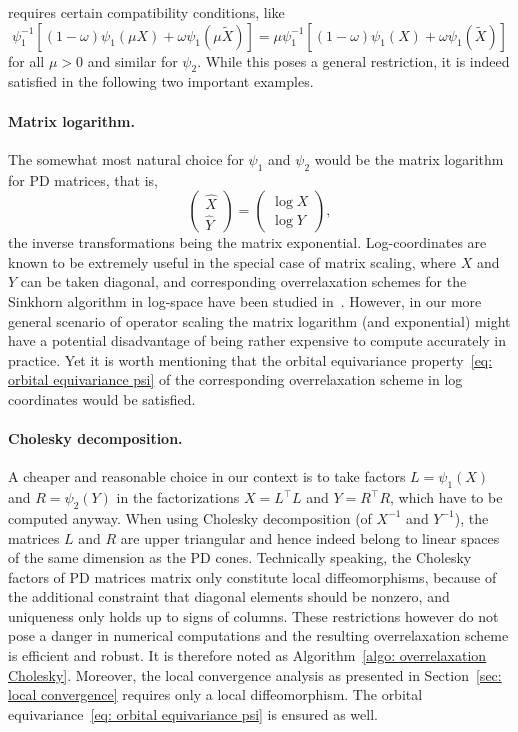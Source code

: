 \documentclass[a4paper]{article}
\theoremstyle{definition}
\numberwithin{equation}{section}
\begin{document}
requires certain compatibility conditions, like
\[
 \psi_1^{-1}[ (1-\omega) \psi_1(\mu X) + \omega \psi_1(\mu \tilde X) ] = \mu \psi_1^{-1}[ (1-\omega) \psi_1(X) + \omega \psi_1(\tilde X) ]
\]
for all $\mu > 0$ and similar for $\psi_2$. While this poses a general restriction, it is indeed satisfied in the following two important examples.

\paragraph{Matrix logarithm.}
The somewhat most natural choice for $\psi_1$ and $\psi_2$ would be the matrix logarithm for PD matrices, that is,
\[
 \begin{pmatrix} \hat X \\ \hat Y \end{pmatrix} = \begin{pmatrix} \log X \\ \log Y \end{pmatrix},
\]
the inverse transformations being the matrix exponential. Log-coordinates are known to be extremely useful in the special case of matrix scaling, where $X$ and $Y$ can be taken diagonal, and corresponding overrelaxation schemes for the Sinkhorn algorithm in log-space have been studied in~\cite{Thibault2021,Lehmann2022}. However, in our more general scenario of operator scaling the matrix logarithm (and exponential) might have a potential disadvantage of being rather expensive to compute accurately in practice. Yet it is worth mentioning that the orbital equivariance property~\eqref{eq: orbital equivariance psi} of the corresponding overrelaxation scheme in log coordinates would be satisfied.

\paragraph{Cholesky decomposition.}
A cheaper and reasonable choice in our context is to take factors $L = \psi_1(X)$ and $R = \psi_2(Y)$ in the factorizations $X = L^\top L$ and $Y = R^\top R$, which have to be computed anyway. When using Cholesky decomposition (of $X^{-1}$ and $Y^{-1}$), the matrices $L$ and $R$ are upper triangular and hence indeed belong to linear spaces of the same dimension as the PD cones. Technically speaking, the Cholesky factors of PD matrices matrix only constitute local diffeomorphisms, because of the additional constraint that diagonal elements should be nonzero, and uniqueness only holds up to signs of columns. These restrictions however do not pose a danger in numerical computations and the resulting overrelaxation scheme is efficient and robust. It is therefore noted as Algorithm~\ref{algo: overrelaxation Cholesky}. Moreover, the local convergence analysis as presented in Section~\ref{sec: local convergence} requires only a local diffeomorphism. The orbital equivariance~\eqref{eq: orbital equivariance psi} is ensured as well.
\end{document}

